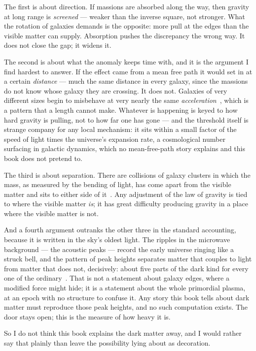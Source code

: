 \documentclass[fontsize=11pt,paper=a4,pagesize=auto,parskip=half-]{scrbook}
\newcommand{\Ixtmp}{}
\DeclareRobustCommand{\Ix}[1]{%
  #1%
  \begingroup
    \lowercase{\gdef\Ixtmp{#1}}%
    \expandafter\index\expandafter{\Ixtmp}%
  \endgroup}
\begin{document}
The first is about direction. If massions are absorbed along the way, then gravity at long range is \emph{screened} --- weaker than the inverse square, not stronger. What the rotation of galaxies demands is the opposite: more pull at the edges than the visible matter can supply. Absorption pushes the discrepancy the wrong way. It does not close the gap; it widens it.

The second is about what the anomaly keeps time with, and it is the argument I find hardest to answer. If the effect came from a mean free path it would set in at a certain \emph{distance} --- much the same distance in every galaxy, since the massions do not know whose galaxy they are crossing. It does not. Galaxies of very different sizes begin to misbehave at very nearly the same \emph{acceleration}~\cite{mcgaugh2016}, which is a pattern that a length cannot make. Whatever is happening is keyed to how hard gravity is pulling, not to how far one has gone --- and the threshold itself is strange company for any local mechanism: it sits within a small factor of the speed of light times the universe's expansion rate, a cosmological number surfacing in galactic dynamics, which no mean-free-path story explains and this book does not pretend to.

The third is about separation. There are collisions of galaxy clusters in which the mass, as measured by the bending of light, has come apart from the visible matter and sits to either side of it~\cite{clowe2006}. Any adjustment of the law of gravity is tied to where the visible matter \emph{is}; it has great difficulty producing gravity in a place where the visible matter is not.

And a fourth argument outranks the other three in the standard accounting, because it is written in the sky's oldest light. The ripples in the microwave background --- the acoustic peaks --- record the early universe ringing like a struck bell, and the pattern of peak heights separates matter that couples to light from matter that does not, decisively: about five parts of the dark kind for every one of the ordinary~\cite{planck2020}. That is not a statement about galaxy edges, where a modified force might hide; it is a statement about the whole primordial plasma, at an epoch with no structure to confuse it. Any story this book tells about \Ix{dark matter} must reproduce those peak heights, and no such computation exists. The door stays open; this is the measure of how heavy it is.

So I do not think this book explains the dark matter away, and I would rather say that plainly than leave the possibility lying about as decoration.
\end{document}
